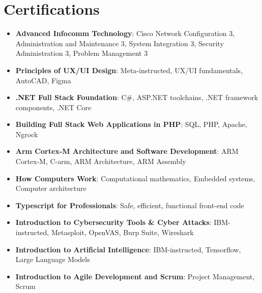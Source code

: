 \documentclass[letterpaper,11pt]{article}
\newcommand{\resumeItem}[2]{
  \item\small{
    \textbf{#1}{: #2 \vspace{-2pt}}
  }
}
\newcommand{\resumeSubItem}[2]{\resumeItem{#1}{#2}\vspace{-4pt}}
\newcommand{\resumeSubHeadingListStart}{\begin{itemize}[leftmargin=*]}
\newcommand{\resumeSubHeadingListEnd}{\end{itemize}}
\begin{document}

\section{Certifications}
 \resumeSubHeadingListStart
    \resumeSubItem{Advanced Infocomm Technology}
      {Cisco Network Configuration 3, Administration and Maintenance 3, System Integration 3, Security Administration 3, Problem Management 3}
    \resumeSubItem{Principles of UX/UI Design}
      {Meta-instructed, UX/UI fundamentals, AutoCAD, Figma}
    \resumeSubItem{.NET Full Stack Foundation}
      {C\#, ASP.NET toolchains, .NET framework components, .NET Core}
    \resumeSubItem{Building Full Stack Web Applications in PHP}
      {SQL, PHP, Apache, Ngrock}
    \resumeSubItem{Arm Cortex-M Architecture and Software Development}
      {ARM Cortex-M, C-arm, ARM Architecture, ARM Assembly}
    \resumeSubItem{How Computers Work}
      {Computational mathematics, Embedded systems, Computer architecture}
    \resumeSubItem{Typescript for Professionals}
      {Safe, efficient, functional front-end code}
    \resumeSubItem{Introduction to Cybersecurity Tools \& Cyber Attacks}
      {IBM-instructed, Metasploit, OpenVAS, Burp Suite, Wireshark}
    \resumeSubItem{Introduction to Artificial Intelligence}
      {IBM-instructed, Tensorflow, Large Language Models}
    \resumeSubItem{Introduction to Agile Development and Scrum}
      {Project Management, Scrum}
      
 \resumeSubHeadingListEnd
 
\end{document}
